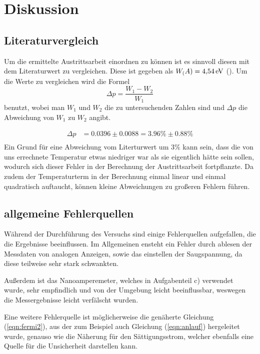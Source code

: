 \section{Diskussion}
\subsection{Literaturvergleich}
Um die ermittelte Austrittsarbeit einordnen zu können ist es sinnvoll diesen mit dem Literaturwert zu vergleichen. Diese ist gegeben als $W_\text(A) = \SI{4,54}{\eV}$ (\cite{formel-sammlung}). Um die Werte 
zu vergleichen wird die Formel 
\begin{equation*}
    \Delta p = \frac{W_1-W_2}{W_1}
\end{equation*}
\noindent
benutzt, wobei man $W_1$ und $W_2$ die zu untersuchenden Zahlen sind und $\Delta p$ die Abweichung von $W_1$ zu $W_2$ angibt.

\begin{align*}
    \Delta p &= 0.0396 \pm 0.0088 = 3.96\% \pm 0.88\% \\
\end{align*}
\noindent
Ein Grund für eine Abweichung vom Literturwert um $ 3 \%$ kann sein, dass die von uns errechnete Temperatur etwas niedriger war als sie eigentlich hätte sein sollen, wodurch sich dieser
Fehler in der Berechnung der Austrittsarbeit fortpflanzte. Da zudem der Temperaturterm in der Berechnung einmal linear und einmal quadratisch auftaucht, können kleine Abweichungen zu großeren
Fehlern führen.


\subsection{allgemeine Fehlerquellen}
Während der Durchführung des Versuchs sind einige Fehlerquellen aufgefallen, die die Ergebnisse beeinflussen.
Im Allgemeinen ensteht ein Fehler durch ablesen der Messdaten von analogen Anzeigen, 
sowie das einstellen der Saugspannung, da diese teilweise sehr stark schwankten.

\noindent
Außerdem ist das Nanoamperemeter, welches in Aufgabenteil c) verwendet wurde, sehr empfindlich und von der Umgebung leicht beeinflussbar,
weswegen die Messergebnisse leicht verfälscht wurden.

\noindent
Eine weitere Fehlerquelle ist möglicherweise die genäherte Gleichung (\ref{eqn:fermi2}), aus der zum Beispiel auch Gleichung (\ref{eqn:anlauf}) hergeleitet wurde, genauso wie die 
Näherung für den Sättigungsstrom, welcher ebenfalls eine Quelle für die Unsicherheit darstellen kann.






